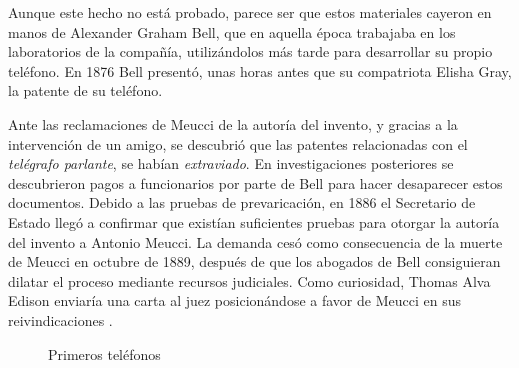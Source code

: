 Aunque este hecho no está probado, parece ser que estos materiales cayeron en manos de Alexander Graham Bell, que en aquella época trabajaba en los laboratorios de la compañía, utilizándolos más tarde para desarrollar su propio teléfono. En 1876 Bell presentó, unas horas antes que su compatriota Elisha Gray, la patente de su teléfono. 

Ante las reclamaciones de Meucci de la autoría del invento, y gracias a la intervención de un amigo, se descubrió que las patentes relacionadas con el \textit{telégrafo parlante}, se habían \textit{extraviado}. En investigaciones posteriores se descubrieron pagos a funcionarios por parte de Bell para hacer desaparecer estos documentos. Debido a las pruebas de prevaricación, en 1886 el Secretario de Estado llegó a confirmar que existían suficientes pruebas para otorgar la autoría del invento a Antonio Meucci. La demanda cesó como consecuencia de la muerte de Meucci en octubre de 1889, después de que los abogados de Bell consiguieran dilatar el proceso mediante recursos judiciales. Como curiosidad, Thomas Alva Edison enviaría una carta al juez posicionándose a favor de Meucci en sus reivindicaciones \cite{Carb07}.

\begin{figure}[h!btp]
	\begin{adjustbox}{minipage=\linewidth, fbox}
		\centering
		\hspace{10mm}
	\end{adjustbox}
	\caption{Primeros teléfonos}
	\label{fig:primeros-telefonos}
\end{figure}


